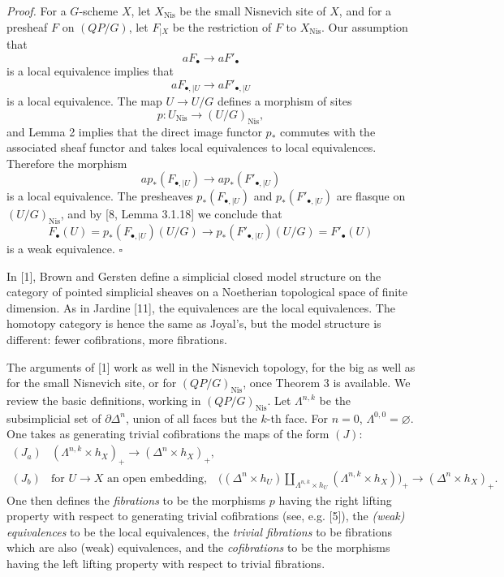 \documentclass[11pt]{article}
\newcommand{\Nis}{\mathrm{Nis}}
\theoremstyle{deligne}
\newenvironment{proofdel}{\noindent\textit{Proof.}}{\hfill$\square$}
\begin{document}
\begin{proofdel}
For a \(G\)-scheme \(X\), let \(X_{\Nis}\) be the small Nisnevich site of \(X\), and for a presheaf \(F\) on \((QP/G)\), let \(F_{|X}\) be the restriction of \(F\) to \(X_{\Nis}\). Our assumption that
\[
  aF_\bullet\longrightarrow aF'_\bullet
\]
is a local equivalence implies that
\[
  aF_{\bullet,|U}\longrightarrow aF'_{\bullet,|U}
\]
is a local equivalence. The map \(U\to U/G\) defines a morphism of sites
\[
  p:U_{\Nis}\longrightarrow (U/G)_{\Nis},
\]
and Lemma 2 implies that the direct image functor \(p_*\) commutes with the associated sheaf functor and takes local equivalences to local equivalences. Therefore the morphism
\[
  a p_*(F_{\bullet,|U})\longrightarrow a p_*(F'_{\bullet,|U})
\]
is a local equivalence. The presheaves \(p_*(F_{\bullet,|U})\) and \(p_*(F'_{\bullet,|U})\) are flasque on \((U/G)_{\Nis}\), and by [8, Lemma 3.1.18] we conclude that
\[
F_\bullet(U)=p_*(F_{\bullet,|U})(U/G)
  \longrightarrow p_*(F'_{\bullet,|U})(U/G)=F'_\bullet(U)
\]
is a weak equivalence.
\end{proofdel}

In [1], Brown and Gersten define a simplicial closed model structure on the category of pointed simplicial sheaves on a Noetherian topological space of finite dimension. As in Jardine [11], the equivalences are the local equivalences. The homotopy category is hence the same as Joyal's, but the model structure is different: fewer cofibrations, more fibrations.

The arguments of [1] work as well in the Nisnevich topology, for the big as well as for the small Nisnevich site, or for \((QP/G)_{\Nis}\), once Theorem 3 is available. We review the basic definitions, working in \((QP/G)_{\Nis}\). Let \(\Lambda^{n,k}\) be the subsimplicial set of \(\partial\Delta^n\), union of all faces but the \(k\)-th face. For \(n=0\), \(\Lambda^{0,0}=\varnothing\). One takes as generating trivial cofibrations the maps of the form \((J)\):
\[
\begin{array}{ll}
(J_a) & (\Lambda^{n,k}\times h_X)_+\longrightarrow (\Delta^n\times h_X)_+,\\[0.4em]
(J_b) & \text{for } U\to X \text{ an open embedding,}\quad
\bigl((\Delta^n\times h_U)\coprod_{\Lambda^{n,k}\times h_U}(\Lambda^{n,k}\times h_X)\bigr)_+
\longrightarrow (\Delta^n\times h_X)_+.
\end{array}
\]
One then defines the \emph{fibrations} to be the morphisms \(p\) having the right lifting property with respect to generating trivial cofibrations (see, e.g. [5]), the \emph{(weak) equivalences} to be the local equivalences, the \emph{trivial fibrations} to be fibrations which are also (weak) equivalences, and the \emph{cofibrations} to be the morphisms having the left lifting property with respect to trivial fibrations.
\end{document}
